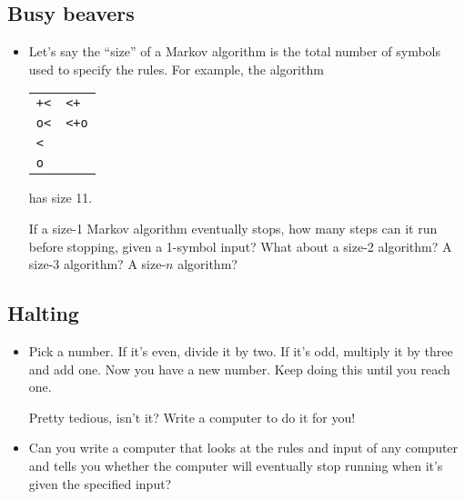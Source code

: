 \documentclass{article}
\newcommand*{\writeit}{\item[\NibRight]}
\newcommand*\proveit{\item[\manimpossiblecube]}
\newcommand{\str}[1]{\texttt{#1}}
\begin{document}
\subsection*{Busy beavers}
\begin{itemize}
\proveit Let's say the ``size'' of a Markov algorithm is the total number of symbols used to specify the rules. For example, the algorithm
\begin{center}
\begin{tabular}{ll}
\str{+\textless} & \str{\textless +} \\
\str{o\textless} & \str{\textless +o} \\
\str{\textless} \\
\str{o}
\end{tabular}
\end{center}
has size 11.

If a size-1 Markov algorithm eventually stops, how many steps can it run before stopping, given a 1-symbol input? What about a size-2 algorithm? A size-3 algorithm? A size-$n$ algorithm?
\end{itemize}
\subsection*{Halting}
\begin{itemize}
\writeit Pick a number. If it's even, divide it by two. If it's odd, multiply it by three and add one. Now you have a new number. Keep doing this until you reach one.

Pretty tedious, isn't it? Write a computer to do it for you!
\proveit Can you write a computer that looks at the rules and input of any computer and tells you whether the computer will eventually stop running when it's given the specified input?
\end{itemize}
\end{document}
